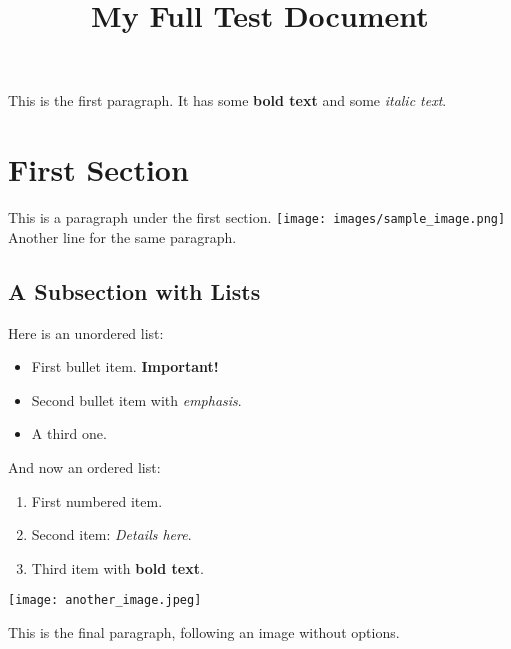 \title{My Full Test Document}

This is the first paragraph.
It has some \textbf{bold text} and some \textit{italic text}.

\section{First Section}
This is a paragraph under the first section.
\texttt{[image: images/sample\_image.png]}
Another line for the same paragraph.

\subsection{A Subsection with Lists}
Here is an unordered list:
\begin{itemize}
    \item First bullet item. \textbf{Important!}
    \item Second bullet item with \textit{emphasis}.
    \item A third one.
\end{itemize}

And now an ordered list:
\begin{enumerate}
    \item First numbered item.
    \item Second item: \textit{Details here}.
    \item Third item with \textbf{bold text}.
\end{enumerate}

\texttt{[image: another\_image.jpeg]}

This is the final paragraph, following an image without options.
